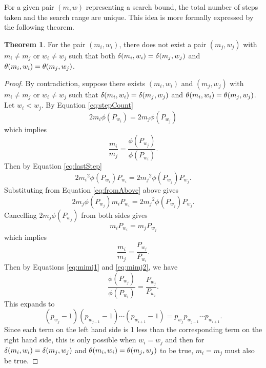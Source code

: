 \documentclass{ucalgthes1}
\theoremstyle{definition}
\newtheorem{thm}{Theorem}[section]
\begin{document}
For a given pair $(m, w)$ representing a search bound, the total number of steps taken and the search range are unique.  This idea is more formally expressed by the following theorem.
\begin{thm}
For the pair $(m_i, w_i)$, there does not exist a pair $(m_j, w_j)$ with $m_i \neq m_j$ or $w_i \neq w_j$ such that both $\delta(m_i, w_i) = \delta(m_j, w_j)$ and $\theta(m_i, w_i) = \theta(m_j, w_j)$.
\end{thm}

\break
\begin{proof}
By contradiction, suppose there exists $(m_i, w_i)$ and $(m_j, w_j)$ with $m_i \neq m_j$ or $w_i \neq w_j$ such that $\delta(m_i, w_i) = \delta(m_j, w_j)$ and $\theta(m_i, w_i) = \theta(m_j, w_j)$.  Let $w_i < w_j$. By Equation \eqref{eq:stepCount}
\begin{equation}
\label{eq:fromAbove}
	2m_i\phi(P_{w_i}) = 2m_j\phi(P_{w_j})
\end{equation}
which implies
\begin{equation}
\label{eq:mimj1}
\frac{m_i}{m_j} = \frac{\phi(P_{w_j})}{\phi(P_{w_i})}.
\end{equation}
Then by Equation \eqref{eq:lastStep}
\[
2{m_i}^2\phi(P_{w_i})P_{w_i} = 2{m_j}^2\phi(P_{w_j})P_{w_j}.
\]
Substituting from Equation \eqref{eq:fromAbove} above gives
\[
2m_j\phi(P_{w_j})m_i P_{w_i} = 2{m_j}^2\phi(P_{w_j})P_{w_j}.
\]
Cancelling $2m_j\phi(P_{w_j})$ from both sides gives
\[
m_iP_{w_i} = m_jP_{w_j}
\]
which implies
\begin{equation}
\label{eq:mimj2}
\frac{m_i}{m_j} = \frac{P_{w_j}}{P_{w_i}}.
\end{equation}
Then by Equations \eqref{eq:mimj1} and \eqref{eq:mimj2}, we have
\[
	\frac{\phi(P_{w_j})}{\phi(P_{w_i})} = \frac{P_{w_j}}{P_{w_i}}.
\]
This expands to
\[
	(p_{w_j} - 1)(p_{w_{j-1}} - 1) \cdots (p_{w_{i+1}} - 1) = p_{w_j} p_{w_{j-1}} \cdots p_{w_{i+1}}.
\]
Since each term on the left hand side is 1 less than the corresponding term on the right hand side, this is only possible when $w_i = w_j$ and then for $\delta(m_i, w_i) = \delta(m_j, w_j)$ and $\theta(m_i, w_i) = \theta(m_j, w_j)$ to be true, $m_i = m_j$ must also be true.
\end{proof}
\end{document}
